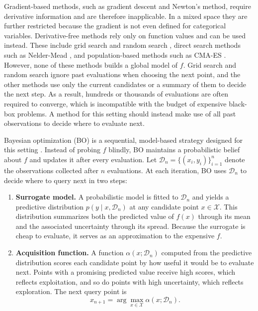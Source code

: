 Gradient-based methods, such as gradient descent and Newton's method, require derivative information and are therefore inapplicable. In a mixed space they are further restricted because the gradient is not even defined for categorical variables. Derivative-free methods rely only on function values and can be used instead. These include grid search and random search \citep{JMLR:v13:bergstra12a}, direct search methods such as Nelder-Mead \citep{10.1093/comjnl/7.4.308}, and population-based methods such as CMA-ES \citep{6790628}. However, none of these methods builds a global model of $f$. Grid search and random search ignore past evaluations when choosing the next point, and the other methods use only the current candidates or a summary of them to decide the next step. As a result, hundreds or thousands of evaluations are often required to converge, which is incompatible with the budget of expensive black-box problems. A method for this setting should instead make use of all past observations to decide where to evaluate next.

Bayesian optimization (BO) is a sequential, model-based strategy designed for this setting \citep{Močkus1975, jones1998efficient, 7352306, frazier2018tutorial}. Instead of probing $f$ blindly, BO maintains a probabilistic belief about $f$ and updates it after every evaluation. Let $\mathcal{D}_n = \{(x_i, y_i)\}_{i=1}^{n}$ denote the observations collected after $n$ evaluations. At each iteration, BO uses $\mathcal{D}_n$ to decide where to query next in two steps:

\begin{enumerate}
  \item \textbf{Surrogate model.} A probabilistic model is fitted to $\mathcal{D}_n$ and yields a predictive distribution $p(y \mid x, \mathcal{D}_n)$ at any candidate point $x \in \mathcal{X}$. This distribution summarizes both the predicted value of $f(x)$ through its mean and the associated uncertainty through its spread. Because the surrogate is cheap to evaluate, it serves as an approximation to the expensive $f$.
  \item \textbf{Acquisition function.} A function $\alpha(x; \mathcal{D}_n)$ computed from the predictive distribution scores each candidate point by how useful it would be to evaluate next. Points with a promising predicted value receive high scores, which reflects exploitation, and so do points with high uncertainty, which reflects exploration. The next query point is
  \begin{equation}
    x_{n+1} = \arg\max_{x \in \mathcal{X}} \alpha(x; \mathcal{D}_n).
    \label{eq:next-query}
  \end{equation}
\end{enumerate}

